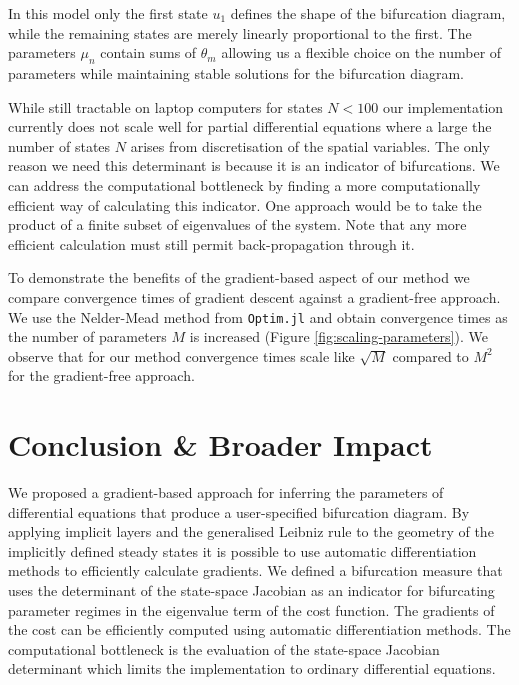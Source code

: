 \documentclass{article}
\begin{document}
In this model only the first state $u_1$ defines the shape of the bifurcation diagram, while the remaining states are merely linearly proportional to the first. The parameters $\mu_n$ contain sums of $\theta_m$ allowing us a flexible choice on the number of parameters while maintaining stable solutions for the bifurcation diagram.

While still tractable on laptop computers for states $N<100$ our implementation currently does not scale well for partial differential equations where a large the number of states $N$ arises from discretisation of the spatial variables. The only reason we need this determinant is because it is an indicator of bifurcations. We can address the computational bottleneck by finding a more computationally efficient way of calculating this indicator. One approach would be to take the product of a finite subset of eigenvalues of the system. Note that any more efficient calculation must still permit back-propagation through it.

To demonstrate the benefits of the gradient-based aspect of our method we compare convergence times of gradient descent against a gradient-free approach. We use the Nelder-Mead method from \texttt{Optim.jl} \cite{KMogensen2018Optim:Julia} and obtain convergence times as the number of parameters $M$ is increased (Figure \ref{fig:scaling-parameters}). We observe that for our method convergence times scale like $\sqrt{M}$ compared to $M^2$ for the gradient-free approach.

\section{Conclusion \& Broader Impact}
\label{section:conclusion}

We proposed a gradient-based approach for inferring the parameters of differential equations that produce a user-specified bifurcation diagram. By applying implicit layers \cite{Look2020DifferentiableLayers,Bai2019DeepModels} and the generalised Leibniz rule \cite{Flanders1973DifferentiationSign} to the geometry of the implicitly defined steady states \cite{Goldman2005CurvatureSurfaces} it is possible to use automatic differentiation methods to efficiently calculate gradients. We defined a bifurcation measure that uses the determinant of the state-space Jacobian as an indicator for bifurcating parameter regimes in the eigenvalue term of the cost function. The gradients of the cost can be efficiently computed using automatic differentiation methods. The computational bottleneck is the evaluation of the state-space Jacobian determinant which limits the implementation to ordinary differential equations.
\end{document}
